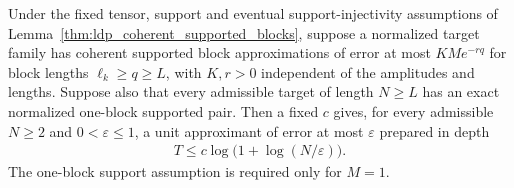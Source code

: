 \begin{lemma}
    \label{thm:ldp_supported_loglog_compilation}
    \leanok
    Under the fixed tensor, support and eventual support-injectivity
    assumptions of Lemma~\ref{thm:ldp_coherent_supported_blocks},
    suppose a normalized target family has coherent supported block
    approximations of error at most $KM e^{-rq}$ for block lengths
    $\ell_k\ge q\ge L$, with $K,r>0$ independent of the amplitudes and
    lengths. Suppose also that every admissible target of length $N\ge L$
    has an exact normalized one-block supported pair. Then a fixed $c$
    gives, for every admissible $N\ge2$ and $0<\varepsilon\le1$, a unit
    approximant of error at most $\varepsilon$ prepared in depth
    \begin{align*}
        T\le c\log\bigl(1+\log(N/\varepsilon)\bigr).
    \end{align*}
    The one-block support assumption is required only for $M=1$.
\end{lemma}
